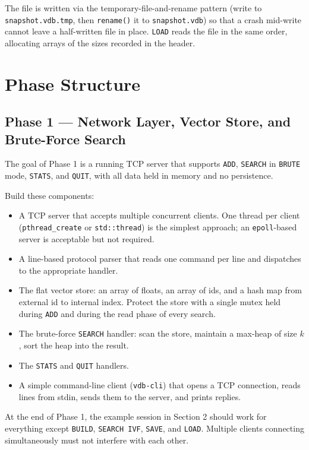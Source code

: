 \documentclass[11pt,a4paper]{article}
\begin{document}
The file is written via the temporary-file-and-rename pattern (write to \texttt{snapshot.vdb.tmp}, then \texttt{rename()} it to \texttt{snapshot.vdb}) so that a crash mid-write cannot leave a half-written file in place. \texttt{LOAD} reads the file in the same order, allocating arrays of the sizes recorded in the header.

\section{Phase Structure}

\subsection{Phase 1 --- Network Layer, Vector Store, and Brute-Force Search}

The goal of Phase 1 is a running TCP server that supports \texttt{ADD}, \texttt{SEARCH} in \texttt{BRUTE} mode, \texttt{STATS}, and \texttt{QUIT}, with all data held in memory and no persistence.

Build these components:

\begin{itemize}
\item A TCP server that accepts multiple concurrent clients. One thread per client (\texttt{pthread\_create} or \texttt{std::thread}) is the simplest approach; an \texttt{epoll}-based server is acceptable but not required.
\item A line-based protocol parser that reads one command per line and dispatches to the appropriate handler.
\item The flat vector store: an array of floats, an array of ids, and a hash map from external id to internal index. Protect the store with a single mutex held during \texttt{ADD} and during the read phase of every search.
\item The brute-force \texttt{SEARCH} handler: scan the store, maintain a max-heap of size $k$, sort the heap into the result.
\item The \texttt{STATS} and \texttt{QUIT} handlers.
\item A simple command-line client (\texttt{vdb-cli}) that opens a TCP connection, reads lines from stdin, sends them to the server, and prints replies.
\end{itemize}

At the end of Phase 1, the example session in Section 2 should work for everything except \texttt{BUILD}, \texttt{SEARCH IVF}, \texttt{SAVE}, and \texttt{LOAD}. Multiple clients connecting simultaneously must not interfere with each other.
\end{document}
